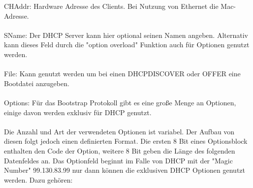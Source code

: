 CHAddr: Hardware Adresse des Clients. Bei Nutzung von Ethernet die Mac-Adresse. \\\\
SName: Der DHCP Server kann hier optional seinen Namen angeben. Alternativ kann dieses Feld durch die "option overload" Funktion auch für Optionen genutzt werden.\\\\
File: Kann genutzt werden um bei einen DHCPDISCOVER oder OFFER eine Bootdatei anzugeben. \\\\
Options: Für das Bootstrap Protokoll gibt es eine große Menge an Optionen, einige davon werden exklusiv für DHCP genutzt. \\\\
Die Anzahl und Art der verwendeten Optionen ist variabel. Der Aufbau von diesen folgt jedoch einen definierten Format. Die ersten 8 Bit eines Optionsblock enthalten den Code der Option, weitere 8 Bit geben die Länge des folgenden Datenfeldes an. Das Optionfeld beginnt im Falle von DHCP mit der "Magic Number" 99.130.83.99 nur dann können die exklusiven DHCP Optionen genutzt werden.
Dazu gehören:
